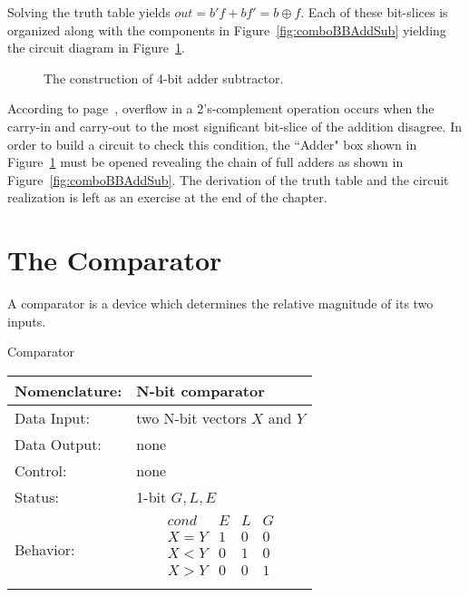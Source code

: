 Solving the truth table yields $out = b'f + bf' = b \oplus f$.
Each of these bit-slices is organized along with the components
in Figure~\ref{fig:comboBBAddSub} yielding the circuit diagram in
Figure~\ref{fig:comboBBTotalAddSub}.


\begin{figure}[ht]
\caption{The construction of 4-bit adder subtractor.}
\label{fig:comboBBTotalAddSub}
\end{figure}
\label{page:as}


According to page~\pageref{page:Ovf}, overflow in a 2's-complement 
operation occurs when the carry-in and carry-out to the most
significant bit-slice of the addition disagree.  In order to 
build a circuit to check this condition, the ``Adder" box shown in 
Figure~\ref{fig:comboBBTotalAddSub} must be opened revealing
the chain of full adders as shown in Figure~\ref{fig:comboBBAddSub}.
The derivation of the truth table and the circuit realization
is left as an exercise at the end of the chapter.

\section{The Comparator}
A comparator is a device which determines the relative magnitude
of its two inputs.

\begin{buildingblock}{Comparator}
\label{buildingblock:comparator}

\begin{tabular}{|l|p{3.5in}|} \hline
Nomenclature:  & N-bit comparator                \\ \hline
Data Input:    & two N-bit vectors $X$ and $Y$           \\ \hline  
Data Output:   & none               \\ \hline
Control:       & none                      \\ \hline
Status:        & 1-bit $G,L,E$ \\ \hline
Behavior:      & 
		$$\begin{array}{l|l|l|l}
      			cond  & E & L & G \\ \hline
			X = Y & 1 & 0 & 0 \\ \hline
			X < Y & 0 & 1 & 0 \\ \hline
			X > Y & 0 & 0 & 1 \\
		\end{array}$$			\\ \hline
\end{tabular}
\label{page:com}
\end{buildingblock}

